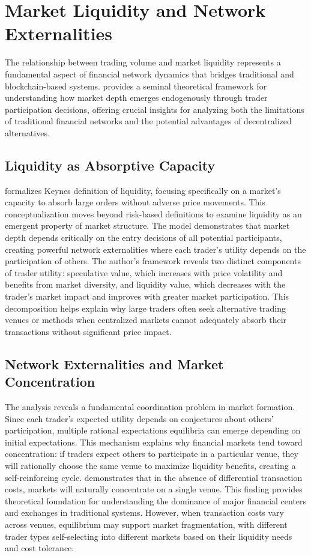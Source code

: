 \section{Market Liquidity and Network Externalities}
The relationship between trading volume and market liquidity represents a fundamental aspect of financial network dynamics that bridges traditional and blockchain-based systems.  provides a seminal theoretical framework for understanding how market depth emerges endogenously through trader participation decisions, offering crucial insights for analyzing both the limitations of traditional financial networks and the potential advantages of decentralized alternatives.
\subsection{Liquidity as Absorptive Capacity}
 formalizes Keynes definition of liquidity, focusing specifically on a market's capacity to absorb large orders without adverse price movements. This conceptualization moves beyond risk-based definitions to examine liquidity as an emergent property of market structure. The model demonstrates that market depth depends critically on the entry decisions of all potential participants, creating powerful network externalities where each trader's utility depends on the participation of others.
The author's framework reveals two distinct components of trader utility: speculative value, which increases with price volatility and benefits from market diversity, and liquidity value, which decreases with the trader's market impact and improves with greater market participation. This decomposition helps explain why large traders often seek alternative trading venues or methods when centralized markets cannot adequately absorb their transactions without significant price impact.
\subsection{Network Externalities and Market Concentration}
The analysis reveals a fundamental coordination problem in market formation. Since each trader's expected utility depends on conjectures about others' participation, multiple rational expectations equilibria can emerge depending on initial expectations. This mechanism explains why financial markets tend toward concentration: if traders expect others to participate in a particular venue, they will rationally choose the same venue to maximize liquidity benefits, creating a self-reinforcing cycle.
 demonstrates that in the absence of differential transaction costs, markets will naturally concentrate on a single venue. This finding provides theoretical foundation for understanding the dominance of major financial centers and exchanges in traditional systems. However, when transaction costs vary across venues, equilibrium may support market fragmentation, with different trader types self-selecting into different markets based on their liquidity needs and cost tolerance.
